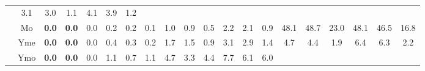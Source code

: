 \documentclass[french,10pt]{article}
\begin{document}
\begin{landscape}
\begin{longtable}{ l c | c c c | c c c | c c c | c c c | c c c | c c c | }
    & 3.1
     & {\footnotesize     3.0
    } & {\footnotesize     1.1
     }


    & 4.1
     & {\footnotesize     3.9
    } & {\footnotesize     1.2
     }
    
    
                    \\*
                        & {\small Mo  }

    &                     \textbf{ 0.0}
     & {\footnotesize     \textbf{ 0.0}
    } & {\footnotesize     0.0
     }


    & 0.2
     & {\footnotesize     0.2
    } & {\footnotesize     0.1
     }


    & 1.0
     & {\footnotesize     0.9
    } & {\footnotesize     0.5
     }


    & 2.2
     & {\footnotesize     2.1
    } & {\footnotesize     0.9
     }


    & 48.1
     & {\footnotesize     48.7
    } & {\footnotesize     23.0
     }


    & 48.1
     & {\footnotesize     46.5
    } & {\footnotesize     16.8
     }
    
    
                    \\*
    & {\small Yme  }

    &                     \textbf{ 0.0}
     & {\footnotesize     \textbf{ 0.0}
    } & {\footnotesize     0.0
     }


    & 0.4
     & {\footnotesize     0.3
    } & {\footnotesize     0.2
     }


    & 1.7
     & {\footnotesize     1.5
    } & {\footnotesize     0.9
     }


    & 3.1
     & {\footnotesize     2.9
    } & {\footnotesize     1.4
     }


    & 4.7
     & {\footnotesize     4.4
    } & {\footnotesize     1.9
     }


    & 6.4
     & {\footnotesize     6.3
    } & {\footnotesize     2.2
     }
    
    
                    \\*
    & {\small Ymo  }

    &                     \textbf{ 0.0}
     & {\footnotesize     \textbf{ 0.0}
    } & {\footnotesize     0.0
     }


    & 1.1
     & {\footnotesize     0.7
    } & {\footnotesize     1.1
     }


    & 4.7
     & {\footnotesize     3.3
    } & {\footnotesize     4.4
     }


    & 7.7
     & {\footnotesize     6.1
    } & {\footnotesize     6.0
     }



\end{longtable}
\end{landscape}
\end{document}
